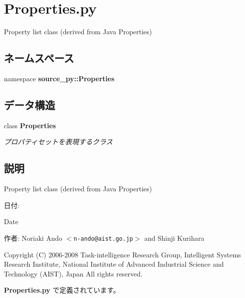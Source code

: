 \section{Properties.py}
\label{_properties_8py}
Property list class (derived from Java Properties) 

\subsection*{ネームスペース}
\begin{CompactItemize}
\item 
namespace \textbf{source\_\-py::Properties}
\end{CompactItemize}
\subsection*{データ構造}
\begin{CompactItemize}
\item 
class {\bf Properties}
\begin{CompactList}\small\item\em プロパティセットを表現するクラス \item\end{CompactList}\end{CompactItemize}


\subsection{説明}
Property list class (derived from Java Properties) 

\begin{Desc}
\item[日付:]\end{Desc}
\begin{Desc}
\item[Date]\end{Desc}
\begin{Desc}
\item[作者:]Noriaki Ando $<${\tt n-ando@aist.go.jp}$>$ and Shinji Kurihara\end{Desc}
Copyright (C) 2006-2008 Task-intelligence Research Group, Intelligent Systems Research Institute, National Institute of Advanced Industrial Science and Technology (AIST), Japan All rights reserved. 

 {\bf Properties.py} で定義されています。